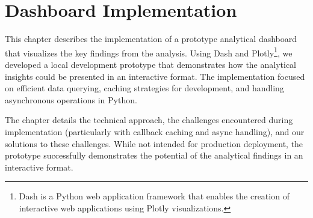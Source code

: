 \chapter{Dashboard Implementation}
\label{ch:dashboard-implementation}

This chapter describes the implementation of a prototype analytical dashboard that visualizes the key findings from the analysis.
Using Dash and Plotly\footnote{Dash is a Python web application framework that enables the creation of interactive web applications using Plotly visualizations\cite{plotly_dash_plotly_com}.},
we developed a local development prototype that demonstrates how the analytical insights could be presented in an interactive format.
The implementation focused on efficient data querying, caching strategies for development, and handling asynchronous operations in Python.

The chapter details the technical approach, the challenges encountered during implementation (particularly with callback caching and async handling), and our solutions to these challenges.
While not intended for production deployment, the prototype successfully demonstrates the potential of the analytical findings in an interactive format.

